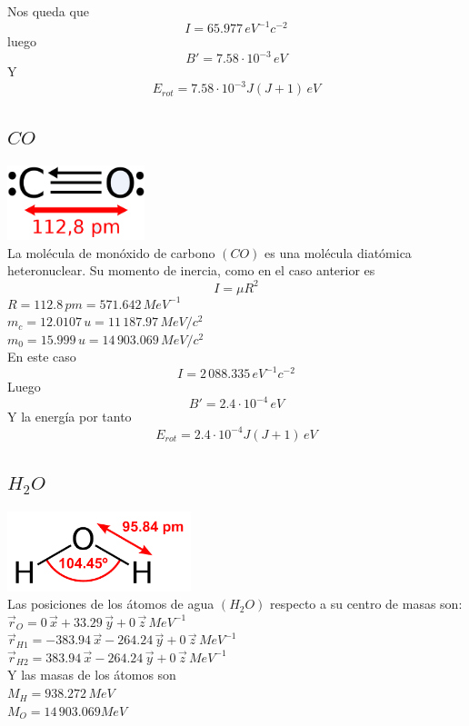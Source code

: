 \documentclass[a4paper]{article}
\begin{document}
 Nos queda que $$I=65.977 \, eV^{-1}c^{-2}$$
 luego 
 $$B'=7.58\cdot 10^{-3}\, eV$$
 Y
 $$E_{rot} = 7.58\cdot 10^{-3}J(J+1)\, eV$$
 \subsection{$CO$}
 \includegraphics[width=0.3\textwidth]{monoxido.png}\\
 La molécula de monóxido de carbono $(CO)$ es una molécula diatómica heteronuclear. Su momento de inercia, como en el caso anterior es $$I=\mu R^2$$
 $R=112.8 \, pm=571.642\, MeV^{-1}$\\
 $m_c=12.0107 \, u=11\, 187.97 \, MeV/c^2$\\
 $m_0=15.999\, u=14\, 903.069\, MeV/c^2$\\
 En este caso 
 $$I= 2\, 088.335\,eV^{-1}c^{-2}$$
 Luego
 $$B'=2.4 \cdot 10^{-4} \, eV$$
 Y la energía por tanto
 $$E_{rot} =2.4 \cdot 10^{-4} J(J+1)\, eV$$
 \subsection{$H_2O$}
 \includegraphics[width=0.4\textwidth]{agua.png}\\
 Las posiciones de los átomos de agua $(H_2O)$ respecto a su centro de masas son:\\
 $\vec r_O = 0\, \vec x + 33.29 \, \vec y + 0 \, \vec z \, MeV^{-1}$\\
 $\vec r_{H1} =-383.94\, \vec x-264.24 \, \vec y + 0 \, \vec z \, MeV^{-1}$\\
 $\vec r_{H2} = 383.94 \, \vec x -264.24 \, \vec y + 0 \, \vec z \, MeV^{-1}$\\
 
 Y las masas de los átomos son\\
 $M_H = 938.272 \, MeV$\\
 $M_O = 14\, 903.069 MeV$\\
 
\end{document}
